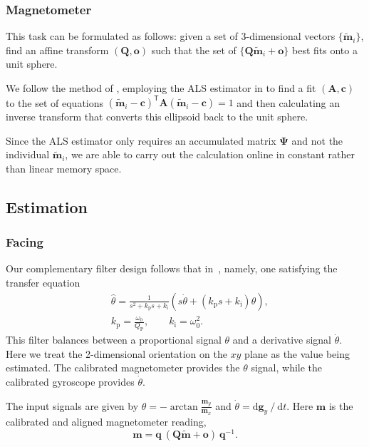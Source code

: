 \documentclass{nime-alternate} %
\begin{document}
\subsubsection{Magnetometer}
\label{appendix:calib-mag}
This task can be formulated as follows: given a set of 3-dimensional vectors $\{ \tilde{\mathbf{m}}_i \}$, find an affine transform $(\mathbf{Q}, \mathbf{o})$ such that the set of $\{\mathbf{Q} \tilde{\mathbf{m}}_i + \mathbf{o}\}$ best fits onto a unit sphere.

We follow the method of \cite{Renaudin2010}, employing the ALS estimator in \cite{Markovsky_2004_ALS} to find a fit $(\mathbf{A}, \mathbf{c})$ to the set of equations
$(\tilde{\mathbf{m}}_i - \mathbf{c})^\mathsf{T} \mathbf{A} (\tilde{\mathbf{m}}_i - \mathbf{c}) = 1$
and then calculating an inverse transform that converts this ellipsoid back to the unit sphere.

Since the ALS estimator only requires an accumulated matrix $\mathbf{\Psi}$ and not the individual $\tilde{\mathbf{m}}_i$, we are able to carry out the calculation online in constant rather than linear memory space.

\subsection{Estimation}
\subsubsection{Facing}
\label{appendix:est-facing}
Our complementary filter design follows that in~\cite{Min_Complementary}, namely, one satisfying the transfer equation
\begin{equation}
\begin{split}
& \hat{\theta} = \frac 1 {s^2 + k_\mathrm{p} s + k_\mathrm{i}} \left( s \dot\theta + (k_\mathrm{p} s + k_\mathrm{i}) \theta \right) \text{,} \\
& k_\mathrm{p} = \frac {\omega_0} {Q_\mathrm{P}},\qquad k_\mathrm{i} = \omega_0^2\text{.}
\end{split}
\end{equation}
This filter balances between a proportional signal $\theta$ and a derivative signal $\dot\theta$. Here we treat the 2-dimensional orientation on the $xy$ plane as the value being estimated. The calibrated magnetometer provides the $\theta$ signal, while the calibrated gyroscope provides $\dot\theta$.

The input signals are given by $\theta = -\mathop{\mathrm{arctan}} \frac {\mathbf{m}_y} {\mathbf{m}_x}$ and $\dot\theta = \mathrm{d}{\mathbf{g}_y} \mathbin{\mathop{/}} \mathrm{d}t$. Here $\mathbf{m}$ is the calibrated and aligned magnetometer reading,
\begin{equation}\label{eqn:est-facing}
\mathbf{m} = \mathbf{q} \ (\mathbf{Q}\tilde{\mathbf{m}} + \mathbf{o}) \ \mathbf{q}^{-1}\text{.}
\end{equation}
\end{document}

